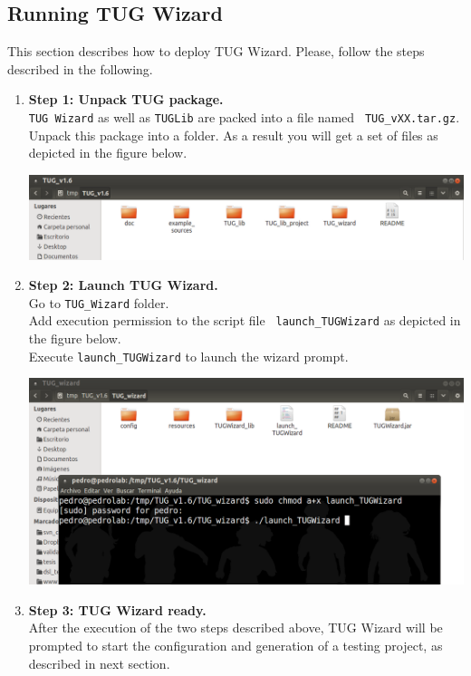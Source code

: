 
\subsection{Running TUG Wizard}

This section describes how to deploy TUG Wizard. Please, follow the steps
described in the following.

\begin{enumerate}
%
\item {\bf Step 1: Unpack TUG package.}\\
%
  {\tt TUG Wizard} as well as
  {\tt TUGLib} are packed into a file named {\tt
    TUG\_vXX.tar.gz}. \\Unpack this package into a folder. As a result
  you will get a set of files as depicted in the figure below.

\vspace{1ex}
\includegraphics[width=.95\textwidth]{images/tug011.png}
\vspace{3ex}
%
\item {\bf Step 2: Launch TUG Wizard.}\\
%
  Go to {\tt TUG\_Wizard}
  folder. \\Add execution permission to the script file {\tt
    launch\_TUGWizard} as depicted in the figure below. \\Execute 
  {\tt launch\_TUGWizard} to launch the wizard prompt. 

\vspace{1ex}
\includegraphics[width=.95\textwidth]{images/tug012.png}
\vspace{3ex}
\newpage
%
\item {\bf Step 3: TUG Wizard ready.}\\
%
  After the execution of the two
  steps described above, TUG Wizard will be prompted to start the
  configuration and generation of a testing project, as described in
  next section.


\end{enumerate}
